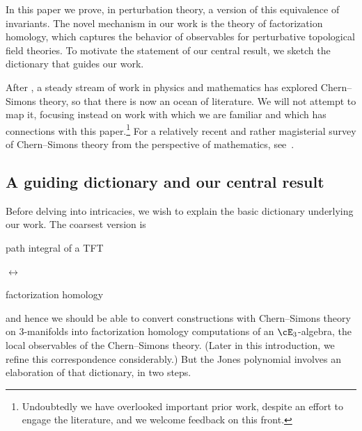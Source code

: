 \documentclass[10pt]{amsart}
\begin{document}
In this paper we prove, in perturbation theory, a version of this equivalence of invariants. 
The novel mechanism in our work is the theory of factorization homology,
which captures the behavior of observables for perturbative topological field theories.
To motivate the statement of our central result,
we sketch the dictionary that guides our work.

\begin{rmk}
After \cite{WitCS}, a steady stream of work in physics and mathematics has explored Chern--Simons theory,
so that there is now an ocean of literature.
We will not attempt to map it, 
focusing instead on work with which we are familiar and which has connections with this paper.\footnote{Undoubtedly we have overlooked important prior work, despite an effort to engage the literature,
and we welcome feedback on this front.}
For a relatively recent and rather magisterial survey of Chern--Simons theory from the perspective of mathematics,
see~\cite{FreAMS}.
\end{rmk}

\subsection{A guiding dictionary and our central result}

Before delving into intricacies,
we wish to explain the basic dictionary underlying our work.
The coarsest version is
\begin{center}
\begin{minipage}{.3\textwidth}
{\selectfont
path integral of a TFT}
\end{minipage}
$\longleftrightarrow\quad$ 
\begin{minipage}{.4\textwidth}
{\selectfont
factorization homology}
\end{minipage}
\end{center}
and hence we should be able to convert constructions with Chern--Simons theory
on 3-manifolds into factorization homology computations of an $\cE_3$-algebra,
the local observables of the Chern--Simons theory.
(Later in this introduction, we refine this correspondence considerably.)
But the Jones polynomial involves an elaboration of that dictionary,
in two steps.
\end{document}
